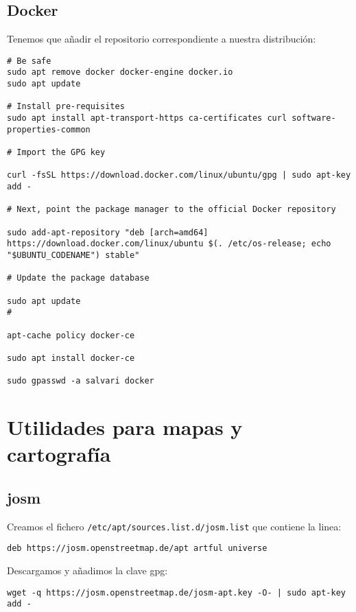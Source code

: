 \documentclass[
  12pt,
  spanish,
]{article}
\begin{document}
\hypertarget{docker}{%
\subsection{Docker}\label{docker}}

Tenemos que añadir el repositorio correspondiente a nuestra
distribución:

\begin{verbatim}
# Be safe
sudo apt remove docker docker-engine docker.io
sudo apt update

# Install pre-requisites
sudo apt install apt-transport-https ca-certificates curl software-properties-common

# Import the GPG key

curl -fsSL https://download.docker.com/linux/ubuntu/gpg | sudo apt-key add -

# Next, point the package manager to the official Docker repository

sudo add-apt-repository "deb [arch=amd64] https://download.docker.com/linux/ubuntu $(. /etc/os-release; echo "$UBUNTU_CODENAME") stable"

# Update the package database

sudo apt update
#

apt-cache policy docker-ce

sudo apt install docker-ce

sudo gpasswd -a salvari docker
\end{verbatim}

\hypertarget{utilidades-para-mapas-y-cartografuxeda}{%
\section{Utilidades para mapas y
cartografía}\label{utilidades-para-mapas-y-cartografuxeda}}

\hypertarget{josm}{%
\subsection{josm}\label{josm}}

Creamos el fichero \texttt{/etc/apt/sources.list.d/josm.list} que
contiene la linea:

\begin{verbatim}
deb https://josm.openstreetmap.de/apt artful universe
\end{verbatim}

Descargamos y añadimos la clave gpg:

\begin{verbatim}
wget -q https://josm.openstreetmap.de/josm-apt.key -O- | sudo apt-key add -
\end{verbatim}
\end{document}
